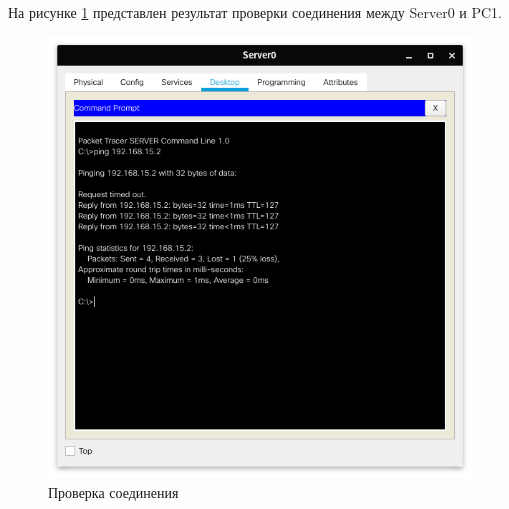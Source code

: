На рисунке \ref{fig:ping} представлен результат проверки соединения между Server0 и PC1.
\begin{figure}[H]
    \centering
    \includegraphics[width=0.5\linewidth]{images/scr03.png}
    \caption{Проверка соединения}%
    \label{fig:ping}
\end{figure}
